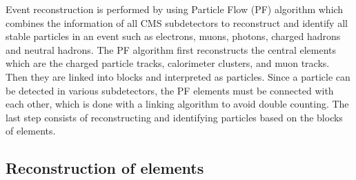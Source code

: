 \documentclass[12pt,oneandhalf,chaparabic,phys,ms,eng]{metu}
\begin{document}
Event reconstruction is performed by using Particle Flow (PF) \cite{PF1,PF4} algorithm which combines the information of all CMS subdetectors to reconstruct and identify all stable particles in an event such as electrons, muons, photons, charged hadrons and neutral hadrons. The PF algorithm first reconstructs the central elements which are the charged particle tracks, calorimeter clusters, and muon tracks. Then they are linked into blocks and interpreted as particles. Since a particle can be detected in various subdetectors, the PF elements must be connected with each other, which is done with a linking algorithm to avoid double counting. The last step consists of reconstructing and identifying particles based on the blocks of elements.

\subsection{Reconstruction of elements}
\label{elements}
\end{document}
